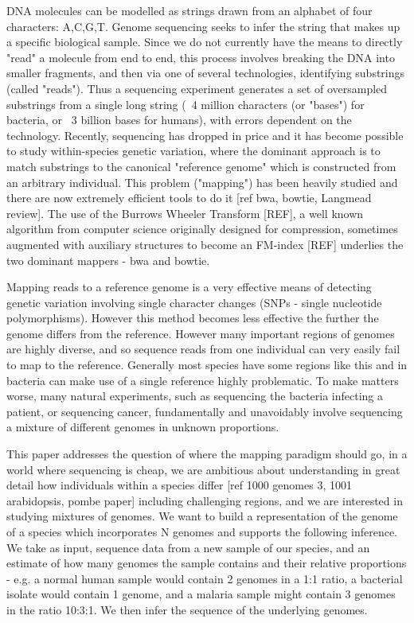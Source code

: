 \documentclass[runningheads,a4paper]{llncs}
\begin{document}
DNA molecules can be modelled as strings drawn from an alphabet of four characters: A,C,G,T. Genome sequencing seeks to infer the string that makes up a specific biological sample. Since we do not currently have the means to directly "read"  a molecule from end to end, this process involves breaking the DNA into smaller fragments, and then via one of several technologies, identifying substrings (called "reads"). Thus a sequencing experiment generates a set of oversampled substrings from a single long string (~4 million characters (or "bases") for bacteria, or ~3 billion bases for humans), with errors dependent on the technology. Recently, sequencing has dropped in price and it has become possible to study within-species genetic variation, where the dominant approach is to match substrings to the canonical "reference genome" which is constructed from an arbitrary individual.  This problem ("mapping") has been heavily studied and there are now extremely efficient tools to do it [ref bwa, bowtie, Langmead review]. The use of the Burrows Wheeler Transform [REF], a well known algorithm from computer science originally designed for compression, sometimes augmented with auxiliary structures to become an FM-index [REF] underlies the two dominant mappers - bwa and bowtie.

Mapping reads to a reference genome is a very effective means of detecting genetic variation involving single character changes (SNPs - single nucleotide polymorphisms). However this method becomes less effective the further the genome differs from the reference. However many important regions of genomes are highly diverse, and so sequence reads from one individual can very easily fail to map to the reference. Generally most species have some regions like this and in bacteria can make use of a single reference highly problematic. To make matters worse, many natural experiments, such as sequencing the bacteria infecting a patient,  or sequencing cancer,  fundamentally and unavoidably involve sequencing a mixture of different genomes in unknown proportions. 

This paper addresses the question of where the mapping paradigm should go, in a world where sequencing is cheap,  we are ambitious about understanding in great detail how individuals within a species differ [ref 1000 genomes 3, 1001 arabidopsis, pombe paper] including challenging regions, and we are interested in studying mixtures of genomes.  We want to build a representation of the genome of a species which incorporates N genomes and supports the following inference. We take as input, sequence data from a new sample of our species, and  an estimate of how many genomes the sample contains and their relative proportions - e.g. a normal human sample would contain 2 genomes in a 1:1 ratio, a bacterial isolate would contain 1 genome, and a malaria sample might contain 3 genomes in the ratio 10:3:1. We then infer the sequence of the underlying genomes. 
\end{document}

